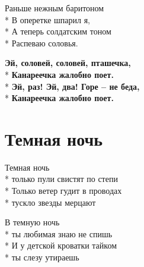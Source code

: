 \medskip

\begin{minipage}{\linewidth}
Раньше нежным баритоном\\*
В оперетке шпарил я,\\*
А теперь солдатским тоном\\*
Распеваю соловья.\\
\end{minipage}\par\medskip\nobreak

\medskip

\begin{minipage}{\linewidth}
\textbf{Эй, соловей, соловей, пташечка,}\\*
\textbf{Канареечка жалобно поет.}\\*
\textbf{Эй, раз! Эй, два! Горе – не беда,}\\*
\textbf{Канареечка жалобно поет.}\\
\end{minipage}

\vspace{\fill}\newpage

\section{Темная ночь}
\label{song:Темная_ночь}

\medskip

\begin{minipage}{\linewidth}
Темная ночь\\*
только пули свистят по степи\\*
Только ветер гудит в проводах\\*
тускло звезды мерцают\\
\end{minipage}\par\medskip\nobreak

\medskip

\begin{minipage}{\linewidth}
В темную ночь\\*
ты любимая знаю не спишь\\*
И у детской кроватки тайком\\*
ты слезу утираешь\\
\end{minipage}\par\medskip\nobreak

